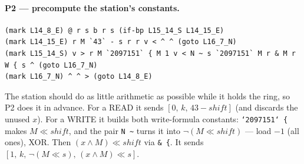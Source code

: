 \documentclass[11pt,a4paper]{article}
\newcommand{\op}[1]{\texttt{#1}}
\begin{document}
\paragraph{P2 --- precompute the station's constants.}
{\footnotesize
\begin{verbatim}
(mark L14_8_E) @ r s b r s (if-bp L15_14_S L14_15_E)
(mark L14_15_E) r M `43` - s r r v < ^ ^ (goto L16_7_N)
(mark L15_14_S) v > r M `2097151` { M 1 v < N ~ s `2097151` M r & M r W { s ^ (goto L16_7_N)
(mark L16_7_N) ^ ^ > (goto L14_8_E)
\end{verbatim}
}
The station should do as little arithmetic as possible while it holds the
ring, so P2 does it in advance. For a READ it sends $[0,\,k,\,43-\mathit{shift}]$
(and discards the unused $x$). For a WRITE it builds both write-formula
constants: \op{`2097151` \{} makes $M\ll\mathit{shift}$, and the pair
\op{N \~{}} turns it into $\lnot(M\ll\mathit{shift})$ --- load $-1$ (all
ones), XOR. Then $(x\wedge M)\ll\mathit{shift}$ via \op{\& \{}. It sends
$[1,\,k,\,\lnot(M\ll s),\,(x\wedge M)\ll s]$.
\end{document}
